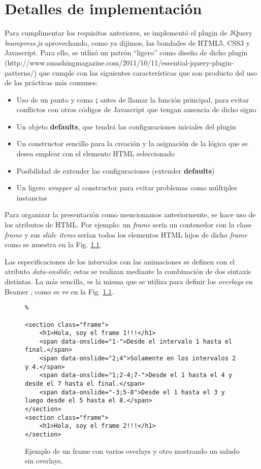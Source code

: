 \chapter{Detalles de implementación} %
\label{cha:detalles_de_implementacion}
	Para cumplimentar los requisitos anteriores, se implementó el plugin de JQuery \textit{beampress.js} aprovechando, como ya dijimos, las bondades de HTML5, CSS3 y Javascript. Para ello, se utlizó un patrón ``ligero'' como diseño de dicho plugin (http://www.smashingmagazine.com/2011/10/11/essential-jquery-plugin-patterns/) que cumple con las siguientes características que son producto del uso de las prácticas más comunes:

	\begin{itemize}
		\item Uso de un punto y coma \textbf{;} antes de llamar la función principal, para evitar conflictos con otros códigos de Javascript que tengan ausencia de dicho signo
		\item Un objeto \textbf{defaults}, que tendrá las configuraciones iniciales del plugin
		\item Un constructor sencillo para la creación y la asignación de la lógica que se desea emplear con el elemento HTML seleccionado
		\item Posibilidad de extender las configuraciones (extender \textbf{defaults})
		\item Un ligero \textit{wrapper} al constructor para evitar problemas como múltiples instancias
	\end{itemize}

	Para organizar la presentación como mencionamos anteriormente, se hace uso de los atributos de HTML. 
	Por ejemplo: un \textit{frame} sería un contenedor con la clase \textit{frame} y sus \textit{slide items} serían
	todos los elementos HTML hijos de dicho \textit{frame} como se muestra en la Fig. \ref{fig:ex1}.	 

	Las especificaciones de los intervalos con las animaciones se definen con el atributo \textit{data-onslide}; estas se realizan mediante la combinación de dos sintaxis distintas. La más sencilla, es la misma que se utiliza para definir los \textit{overlays} en Beamer \cite{overlay}, como se ve en la Fig. \ref{fig:ex1}. 
 

		\begin{figure}[htb]%
			\begin{lstlisting}%

<section class="frame">
	<h1>Hola, soy el frame 1!!!</h1>
    <span data-onslide="1-">Desde el intervalo 1 hasta el final.</span>
    <span data-onslide="2;4">Solamente en los intervalos 2 y 4.</span>
    <span data-onslide="1;2-4;7-">Desde el 1 hasta el 4 y desde el 7 hasta el final.</span>
    <span data-onslide="-3;5-8">Desde el 1 hasta el 3 y luego desde el 5 hasta el 8.</span>
</section>
<section class="frame">
	<h1>Hola, soy el frame 2!!!</h1>
</section>
			\end{lstlisting}
		\caption{Ejemplo de un frame con varios overlays y otro mostrando un saludo sin overlays. \label{fig:ex1}}
		\end{figure}

